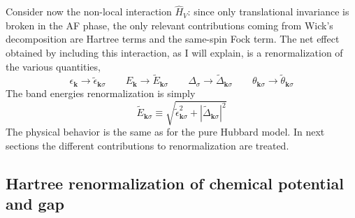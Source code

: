 Consider now the non-local interaction $\hat H_V$: since only translational invariance is broken in the AF phase, the only relevant contributions coming from Wick's decomposition are Hartree terms and the same-spin Fock term. The net effect obtained by including this interaction, as I will explain, is a renormalization of the various quantities,
\[
	\epsilon_\mathbf{k} \to \tilde{\epsilon}_{\mathbf{k}\sigma}
	\qquad
	E_\mathbf{k} \to \tilde{E}_{\mathbf{k}\sigma}
	\qquad
	\Delta_\sigma \to \tilde{\Delta}_{\mathbf{k}\sigma}
	\qquad
	\theta_{\mathbf{k}\sigma} \to \tilde{\theta}_{\mathbf{k}\sigma}
\]
The band energies renormalization is simply
\[
	\tilde{E}_{\mathbf{k}\sigma} \equiv \sqrt{\tilde{\epsilon}_{\mathbf{k}\sigma}^2 + |\tilde{\Delta}_{\mathbf{k}\sigma}|^2}
\]
The physical behavior is the same as for the pure Hubbard model. In next sections the different contributions to renormalization are treated.

\subsection{Hartree renormalization of chemical potential and gap}


